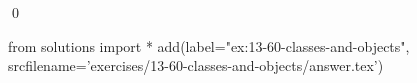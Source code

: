 
\begin{ex}
  \label{ex:13-60-classes-and-objects}
  
  \qed
\end{ex}
\begin{python0}
from solutions import *
add(label="ex:13-60-classes-and-objects",
    srcfilename='exercises/13-60-classes-and-objects/answer.tex')
\end{python0}
